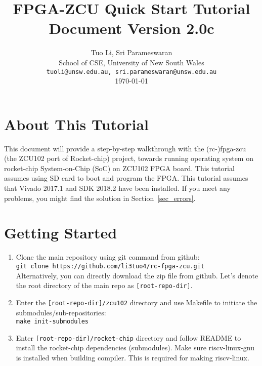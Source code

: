 \documentclass[a4paper,11pt]{article}
\begin{document}
\title{\vspace{-0.7in}\Large {\bf FPGA-ZCU Quick Start Tutorial} \\
Document Version 2.0c
  \vspace{-0.1in}}

\author{Tuo Li, Sri Parameswaran\\
  School of CSE, University of New South Wales \\
  {\tt tuoli@unsw.edu.au, sri.parameswaran@unsw.edu.au} \\
  \today
}
\date{} 

\newpage

\maketitle

\newpage

\section*{About This Tutorial}
This document will provide a step-by-step walkthrough with the (rc-)fpga-zcu (the ZCU102 port of Rocket-chip) project, towards running operating system on rocket-chip System-on-Chip (SoC) on ZCU102 FPGA board. 
This tutorial assumes using SD card to boot and program the FPGA.
This tutorial assumes that Vivado 2017.1 and SDK 2018.2 have been installed. 
If you meet any problems, you might find the solution in Section~\ref{sec_errors}.
\newpage

\section{Getting Started}

\newcommand{\rootdir}{[root-repo-dir]}

\begin{enumerate}
\item Clone the main repository using git command from github:\\
 {\tt git clone https://github.com/li3tuo4/rc-fpga-zcu.git}\\
 Alternatively, you can directly download the zip file from github.
 Let's denote the root directory of the main repo as \texttt{\rootdir}.
\item Enter the {\tt \rootdir/zcu102} directory and use Makefile to initiate the submodules/sub-repositories:\\
 {\tt make init-submodules}
 \item Enter {\tt \rootdir/rocket-chip} directory and follow README to install the rocket-chip dependencies (submodules). Make sure riscv-linux-gnu is installed when building compiler. This is required for making riscv-linux.
\end{enumerate}
\end{document}
